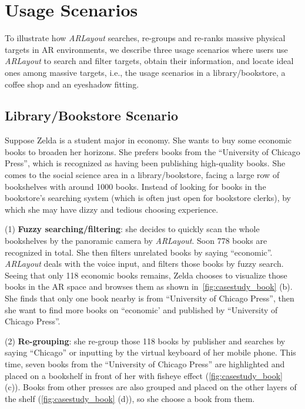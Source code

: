 
\section{Usage Scenarios}

To illustrate how \textit{ARLayout} searches, re-groups and re-ranks massive physical targets
in AR environments,
we describe three usage scenarios where users use \textit{ARLayout} to
search and filter targets, obtain their information, and locate
ideal ones among massive targets,
i.e., the usage scenarios in a library/bookstore, a coffee shop and an eyeshadow fitting.

\subsection{Library/Bookstore Scenario}

Suppose Zelda is a student major in economy.
She wants to buy some economic books to broaden her horizons.
She prefers books from the ``University of Chicago Press'',
which is recognized as having been publishing high-quality books.
She comes to the social science area in a library/bookstore,
facing a large row of bookshelves with around 1000 books.
Instead of looking for books in the bookstore's searching system (which is often just
open for bookstore clerks),
by which she may have dizzy and tedious choosing experience.

(1) \textbf{Fuzzy searching/filtering}: she decides to quickly scan the whole bookshelves by the panoramic camera by \textit{ARLayout}.
Soon 778 books are recognized in total.
She then filters unrelated books by saying ``economic''.
\textit{ARLayout} deals with the voice input, and filters those books by fuzzy search.
Seeing that only 118 economic books remains, Zelda chooses to visualize those books
in the AR space and browses them as shown in~\autoref{fig:casestudy_book} (b).
She finds that only one book nearby is from ``University of Chicago Press'',
then she want to find more books on ``economic' and published by ``University of Chicago Press''.

(2) \textbf{Re-grouping}: she re-group those 118 books by publisher and searches by saying ``Chicago''
or inputting by the virtual keyboard of her mobile phone.
This time, seven books from the ``University of Chicago Press'' are highlighted and
placed on a bookshelf in front of her with fisheye effect (\autoref{fig:casestudy_book} (c)).
Books from other presses are also grouped and placed on the other layers of the
shelf (\autoref{fig:casestudy_book} (d)), so she choose a book from them.

